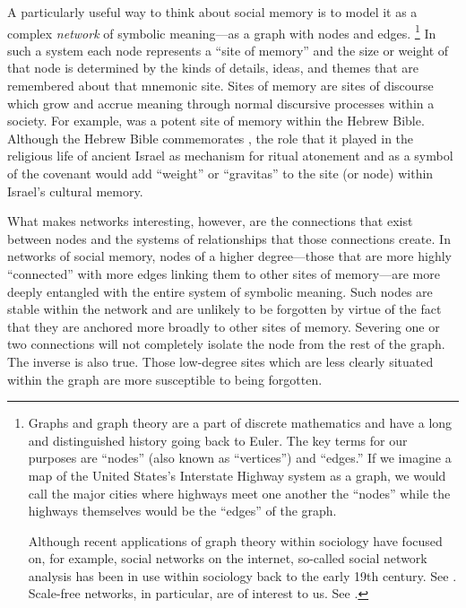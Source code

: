 A particularly useful way to think about social memory is to model it as a complex \emph{network} of symbolic meaning---as a graph with nodes and edges.%
    \footnote{Graphs and graph theory are a part of discrete mathematics and have a long and distinguished history going back to Euler. The key terms for our purposes are ``nodes'' (also known as ``vertices'') and ``edges.'' If we imagine a map of the United States's Interstate Highway system as a graph, we would call the major cities where highways meet one another the ``nodes'' while the highways themselves would be the ``edges'' of the graph.
    
    Although recent applications of graph theory within sociology have focused on, for example, social networks on the internet, so-called social network analysis has been in use within sociology back to the early 19th century. See \cite[10--16]{linton2004}. Scale-free networks, in particular, are of interest to us. See \cite{barabasi_science2009}.}
In such a system each node represents a ``site of memory'' and the size or weight of that node is determined by the kinds of details, ideas, and themes that are remembered about that mnemonic site. Sites of memory are sites of discourse which grow and accrue meaning through normal discursive processes within a society. For example, \thetemple was a potent site of memory within the Hebrew Bible. Although the Hebrew Bible commemorates \thetemple, the role that it played in the religious life of ancient Israel as mechanism for ritual atonement and as a symbol of the covenant would add ``weight'' or ``gravitas'' to the site (or node) within Israel's cultural memory. 

What makes networks interesting, however, are the connections that exist between nodes and the systems of relationships that those connections create. In networks of social memory, nodes of a higher degree---those that are more highly ``connected'' with more edges linking them to other sites of memory---are more deeply entangled with the entire system of symbolic meaning. Such nodes are stable within the network and are unlikely to be forgotten by virtue of the fact that they are anchored more broadly to other sites of memory. Severing one or two connections will not completely isolate the node from the rest of the graph. The inverse is also true. Those low-degree sites which are less clearly situated within the graph are more susceptible to being forgotten.

